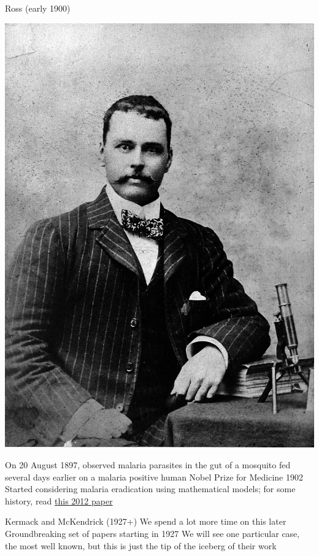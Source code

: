 \documentclass[aspectratio=169]{beamer}\usepackage[]{graphicx}\usepackage[]{xcolor}
\begin{document}
\begin{frame}{Ross (early 1900)}
\begin{minipage}{0.5\textwidth}
    \includegraphics[width=\textwidth]{FIGS/RonaldRoss_WellcomeCollection.jpg}
\end{minipage}
\begin{minipage}{0.47\textwidth}
\bbullet On 20 August 1897, observed malaria parasites in the gut of a mosquito fed several days earlier on a malaria positive human
\vskip1cm
\bbullet Nobel Prize for Medicine 1902
\vskip1cm
\bbullet Started considering malaria eradication using mathematical models; for some history, read \href{https://www.ncbi.nlm.nih.gov/pmc/articles/PMC3320609/pdf/ppat.1002588.pdf}{this 2012 paper}
\end{minipage}
\end{frame}


\begin{frame}{Kermack and McKendrick (1927+)}
\bbullet We spend a lot more time on this later
\vfill
\bbullet Groundbreaking set of papers starting in 1927
\vfill
\bbullet We will see one particular case, the most well known, but this is just the tip of the iceberg of their work
\end{frame}
\end{document}
